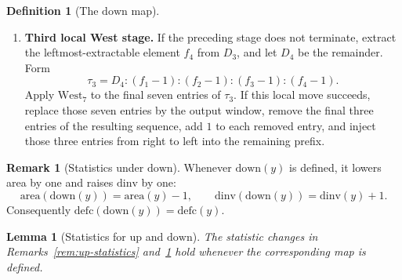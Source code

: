 \documentclass[11pt]{article}
\theoremstyle{plain}
\newtheorem{lemma}[theorem]{Lemma}
\theoremstyle{definition}
\newtheorem{definition}[theorem]{Definition}
\newtheorem{remark}[theorem]{Remark}
\theoremstyle{remark}
\newcommand{\dinv}{\mathrm{dinv}}
\newcommand{\area}{\mathrm{area}}
\newcommand{\defc}{\mathrm{defc}}
\begin{document}
\begin{definition}[The \(\mathrm{down}\) map]
\begin{enumerate}[label=\textup{(\arabic*)}]
  \item \textbf{Third local West stage.}  If the preceding stage does not
  terminate, extract the leftmost-extractable element \(f_4\) from \(D_3\), and
  let \(D_4\) be the remainder.  Form
  \[
    \tau_3=D_4:(f_1-1):(f_2-1):(f_3-1):(f_4-1).
  \]
  Apply \(\mathrm{West}_7\) to the final seven entries of \(\tau_3\).  If this
  local move succeeds, replace those seven entries by the output window, remove
  the final three entries of the resulting sequence, add \(1\) to each removed
  entry, and inject those three entries from right to left into the remaining
  prefix.
\end{enumerate}
\end{definition}

\begin{remark}[Statistics under \(\mathrm{down}\)]
\label{rem:down-statistics}
Whenever \(\mathrm{down}(y)\) is defined, it lowers area by one and raises
\(\dinv\) by one:
\[
  \area(\mathrm{down}(y))=\area(y)-1,
  \qquad
  \dinv(\mathrm{down}(y))=\dinv(y)+1.
\]
Consequently \(\defc(\mathrm{down}(y))=\defc(y)\).
\end{remark}

\begin{lemma}[Statistics for \(\mathrm{up}\) and \(\mathrm{down}\)]
\label{lem:up-down-statistics}
The statistic changes in Remarks~\ref{rem:up-statistics}
and~\ref{rem:down-statistics} hold whenever the corresponding map is defined.
\end{lemma}
\end{document}
